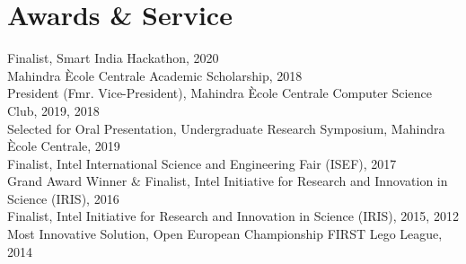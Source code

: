 \documentclass[a4paper,11pt]{article}
\begin{document}
\section{Awards \& Service}
    {\small
    \begin{adjustwidth}{10pt}{}
        Finalist, Smart India Hackathon, 2020 \\
        Mahindra \`{E}cole Centrale Academic Scholarship, 2018 \\
        President (Fmr. Vice-President), Mahindra \`{E}cole Centrale Computer Science Club, 2019, 2018 \\
        Selected for Oral Presentation, Undergraduate Research Symposium, Mahindra \`{E}cole Centrale, 2019 \\
        Finalist, Intel International Science and Engineering Fair (ISEF), 2017 \\
        Grand Award Winner \& Finalist, Intel Initiative for Research and Innovation in Science (IRIS), 2016 \\
        Finalist, Intel Initiative for Research and Innovation in Science (IRIS), 2015, 2012 \\
        Most Innovative Solution, Open European Championship FIRST Lego League, 2014
    \end{adjustwidth}
    }
\end{document}
